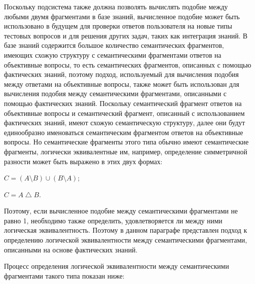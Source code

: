 Поскольку подсистема также должна позволять вычислять подобие между любыми двумя фрагментами в базе знаний, вычисленное подобие может быть использовано в будущем для проверки ответов пользователя на новые типы тестовых вопросов и для решения других задач, таких как интеграция знаний. В базе знаний содержится большое количество семантических фрагментов, имеющих схожую структуру с семантическими фрагментами ответов на объективные вопросы, то есть семантических фрагментов, описанных с помощью фактических знаний, поэтому подход, используемый для вычисления подобия между ответами на объективные вопросы, также может быть использован для вычисления подобия между семантическими фрагментами, описанными с помощью фактических знаний. Поскольку семантический фрагмент ответов на объективные вопросы и семантический фрагмент, описанный с использованием фактических знаний, имеют схожую семантическую структуру, далее они будут единообразно именоваться семантическим фрагментом ответов на объективные вопросы. Но семантические фрагменты этого типа обычно имеют семантические фрагменты, логически эквивалентные им, например, определение симметричной разности может быть выражено в этих двух формах:

\begin{textitemize}
	\item $C= \left ( A\setminus B \right ) \cup \left ( B \setminus A \right )$;
	\item $C= A\bigtriangleup B$.
\end{textitemize}

Поэтому, если вычисленное подобие между семантическими фрагментами не равно 1, необходимо также определить, удовлетворяется ли между ними логическая эквивалентность. Поэтому в данном параграфе представлен подход к определению логической эквивалентности между семантическими фрагментами, описанными на основе фактических знаний.

Процесс определения логической эквивалентности между семантическими фрагментами такого типа показан ниже:

